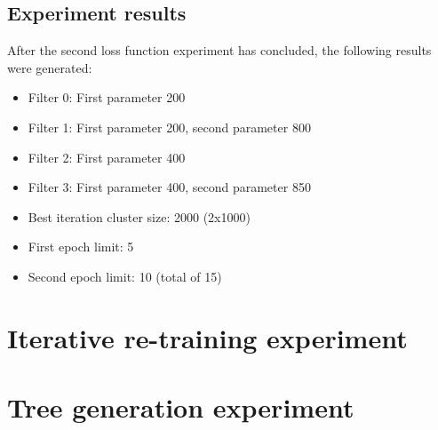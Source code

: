 \subsection{Experiment results}

After the second loss function experiment has concluded, the following results were generated:

\begin{itemize}
    \item Filter 0: First parameter 200
    \item Filter 1: First parameter 200, second parameter 800
    \item Filter 2: First parameter 400
    \item Filter 3: First parameter 400, second parameter 850
    \item Best iteration cluster size: 2000 (2x1000)
    \item First epoch limit: 5
    \item Second epoch limit: 10 (total of 15)
\end{itemize}





\section{Iterative re-training experiment}
\label{ex:iter-retrain}

\section{Tree generation experiment}
\label{ex:tree}

